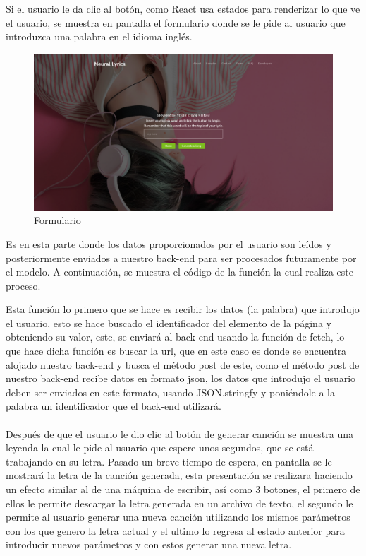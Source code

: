 \documentclass[12pt, a4paper, titlepage]{report}
\begin{document}
Si el usuario le da clic al botón, como React usa estados para renderizar lo que ve el usuario, se muestra en pantalla el formulario donde se le pide al usuario que introduzca una palabra en el idioma inglés.
\begin{figure}[H]
	\includegraphics[width=13.5cm]{./imagenes/Desarrollo/AplicacionWeb/Pformulario.png}
	\centering 
	\caption{Formulario}
\end{figure}
Es en esta parte donde los datos proporcionados por el usuario son leídos y posteriormente enviados a nuestro back-end para ser procesados futuramente por el modelo. A continuación, se muestra el código de la función la cual realiza este proceso.
\begin{center}
	
\end{center}
Esta función lo primero que se hace es recibir los datos (la palabra) que introdujo el usuario, esto se hace buscado el identificador del elemento de la página y obteniendo su valor, este, se enviará al back-end usando la función de fetch, lo que hace dicha función es buscar la url, que en este caso es donde se encuentra alojado nuestro back-end y busca el método post de este, como el método post de nuestro back-end recibe datos en formato json, los datos que introdujo el usuario deben ser enviados en este formato, usando JSON.stringfy y poniéndole a la palabra un identificador que el back-end utilizará.\\\\
Después de que el usuario le dio clic al botón de generar canción se muestra una leyenda la cual le pide al usuario que espere unos segundos, que se está trabajando en su letra. Pasado un breve tiempo de espera, en pantalla se le mostrará la letra de la canción generada, esta presentación se realizara haciendo un efecto similar al de una máquina de escribir, así como 3 botones, el primero de ellos le permite descargar la letra generada en un archivo de texto, el segundo le permite al usuario generar una nueva canción utilizando los mismos parámetros con los que genero la letra actual y el ultimo lo regresa al estado anterior para introducir nuevos parámetros y con estos generar una nueva letra.
\end{document}
